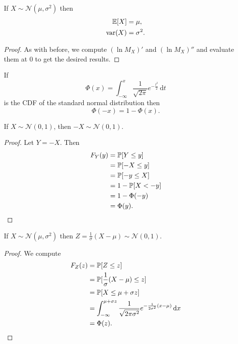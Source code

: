 \documentclass[class=article, crop=false]{standalone}
\begin{document}
  \begin{theorem}{}
    If $X\sim \mathcal{N}(\mu, \sigma^2)$ then
    \begin{align*}
      \E[X] &= \mu, \\
      \var(X) &= \sigma^2.
    \end{align*}
    \begin{proof}
      As with before, we compute $(\ln M_X)'$ and $(\ln M_X)''$ and evaluate them at 0 to get the desired results.
    \end{proof}
  \end{theorem}
  \begin{theorem}{}
    If
    \[
      \Phi(x) = \int_{-\infty}^{x} \frac{1}{\sqrt{2\pi}}e^{-\frac{t^2}{2}} \,\mathrm dt
    \]
    is the CDF of the standard normal distribution then
    \[
      \Phi(-x) = 1 - \Phi(x).
    \]
  \end{theorem}
  \begin{theorem}{}
    If $X\sim \mathcal{N}(0, 1)$, then $-X\sim \mathcal{N}(0, 1)$.
    \begin{proof}
      Let $Y = -X$. Then
      \begin{align*}
        F_Y(y) &= \P[Y \leq y] \\
               &= \P[-X \leq y] \\
               &= \P[-y \leq X] \\
               &= 1 - \P[X < -y] \\
               &= 1 - \Phi(-y) \\
               &= \Phi(y).
      \end{align*}
    \end{proof}
  \end{theorem}
  \begin{theorem}{}
    If $X\sim \mathcal{N}(\mu, \sigma^2)$ then $Z = \frac{1}{\sigma}(X - \mu)\sim \mathcal{N}(0, 1)$.
    \begin{proof}
      We compute
      \begin{align*}
        F_Z(z) &= \P[Z \leq z] \\
               &= \P[\frac{1}{\sigma}(X - \mu) \leq z] \\
               &= \P[X \leq \mu + \sigma z] \\
               &= \int_{-\infty}^{\mu + \sigma z} \frac{1}{\sqrt{2\pi\sigma^2}} e^{-\frac{1}{2\sigma^2}(x - \mu)} \,\mathrm dx \\
               &= \Phi(z).
      \end{align*}
    \end{proof}
  \end{theorem}
\end{document}

